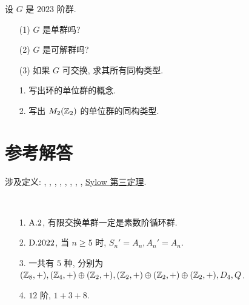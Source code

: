 \problem[题目 6] 设 $G$ 是 $2023$ 阶群.

\begin{itemize}
	\item[(1)] $G$ 是单群吗?
	\item[(2)] $G$ 是可解群吗?
	\item[(3)] 如果 $G$ 可交换, 求其所有同构类型.
\end{itemize}

\problem[题目 7]
\begin{itemize}
	\item[1.] 写出环的单位群的概念.
	\item[2.] 写出 $M_2(\mathbb Z_2)$ 的单位群的同构类型.
\end{itemize}

\newpage

\section*{参考解答}

涉及定义: , , , , , , , , \hyperref[Sylow3]{Sylow 第三定理}.

\problem[题目 1]

\begin{solution}\

	\begin{itemize}
		\item[1.] $\text {A}.2$, 有限交换单群一定是素数阶循环群.

		\item[2.] $\text {D}.2022$, 当 $n\geqslant 5$ 时, $S_n'=A_n,A_n'=A_n$.

		\item[3.] 一共有 $5$ 种, 分别为 $(\mathbb Z_8,+),(\mathbb Z_4,+)\oplus(\mathbb Z_2,+),(\mathbb Z_2,+)\oplus(\mathbb Z_2,+)\oplus(\mathbb Z_2,+),D_4,Q$.

		\item[4.] $12$ 阶, $1+3+8$.
	\end{itemize}
\end{solution}

\problem[题目 2]

